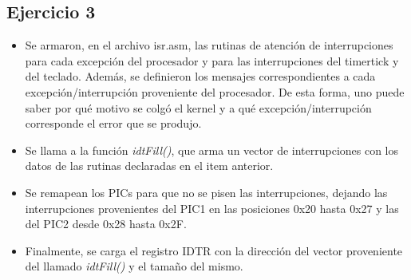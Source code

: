 \subsection{Ejercicio 3}
\begin{itemize}
 \item Se armaron, en el archivo isr.asm, las rutinas de atenci\'on de interrupciones para cada excepci\'on del procesador y para las interrupciones del timertick y del teclado. Adem\'as, se definieron los mensajes correspondientes a cada excepci\'on/interrupci\'on proveniente del procesador. De esta forma, uno puede saber por qu\'e motivo se colg\'o el kernel y a qu\'e excepci\'on/interrupci\'on corresponde el error que se produjo.
 \item Se llama a la funci\'on \textit{idtFill()}, que arma un vector de interrupciones con los datos de las rutinas declaradas en el item anterior.
 \item Se remapean los PICs para que no se pisen las interrupciones, dejando las interrupciones provenientes del PIC1 en las posiciones 0x20 hasta 0x27 y las del PIC2 desde 0x28 hasta 0x2F.
 \item Finalmente, se carga el registro IDTR con la direcci\'on del vector proveniente del llamado \textit{idtFill()} y el tama\~no del mismo.
\end{itemize}


